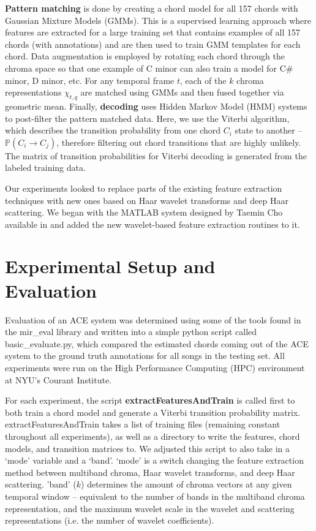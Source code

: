 \documentclass{article}
\begin{document}
	\textbf{Pattern matching} is done by creating a chord model for all 157 chords with Gaussian Mixture Models (GMMs). This is a supervised learning approach where features are extracted for a large training set that contains examples of all 157 chords (with annotations) and are then used to train GMM templates for each chord. Data augmentation is employed by rotating each chord through the chroma space so that one example of C minor can also train a model for C\# minor, D minor, etc. For any temporal frame $t$, each of the $k$ chroma representations $\chi_{t,q}$ are matched using GMMs and then fused together via geometric mean. Finally, \textbf{decoding} uses Hidden Markov Model (HMM) systems to post-filter the pattern matched data. Here, we use the Viterbi algorithm, which describes the transition probability from one chord $C_i$ state to another -- $\mathds{P}(C_i \rightarrow C_j)$, therefore filtering out chord transitions that are highly unlikely. The matrix of transition probabilities for Viterbi decoding is generated from the labeled training data.
	
	Our experiments looked to replace parts of the existing feature extraction techniques with new ones based on Haar wavelet transforms and deep Haar scattering. We began with the MATLAB system designed by Taemin Cho available in \cite{choGithub} and added the new wavelet-based feature extraction routines to it.
	

\section{Experimental Setup and Evaluation}\label{sec:experiment}
Evaluation of an ACE system was determined using some of the tools found in the \textsf{mir\_eval} library \cite{raffel2014mir} and written into a simple python script called \textsf{basic\_evaluate.py}, which compared the estimated chords coming out of the ACE system to the ground truth annotations for all songs in the testing set. All experiments were run on the High Performance Computing (HPC) environment at NYU's Courant Institute. 
	
	For each experiment, the script \textsf{\textbf{extractFeaturesAndTrain}} is called first to both train a chord model and generate a Viterbi transition probability matrix. \textsf{extractFeaturesAndTrain} takes a list of training files (remaining constant throughout all experiments), as well as a directory to write the features, chord models, and transition matrices to. We adjusted this script to also take in a `mode' variable and a `band'. `mode' is a switch changing the feature extraction method between multiband chroma, Haar wavelet transforms, and deep Haar scattering. 'band' ($k$) determines the amount of chroma vectors at any given temporal window -- equivalent to the number of bands in the multiband chroma representation, and the maximum wavelet scale in the wavelet and scattering representations (i.e. the number of wavelet coefficients).
	
\end{document}
